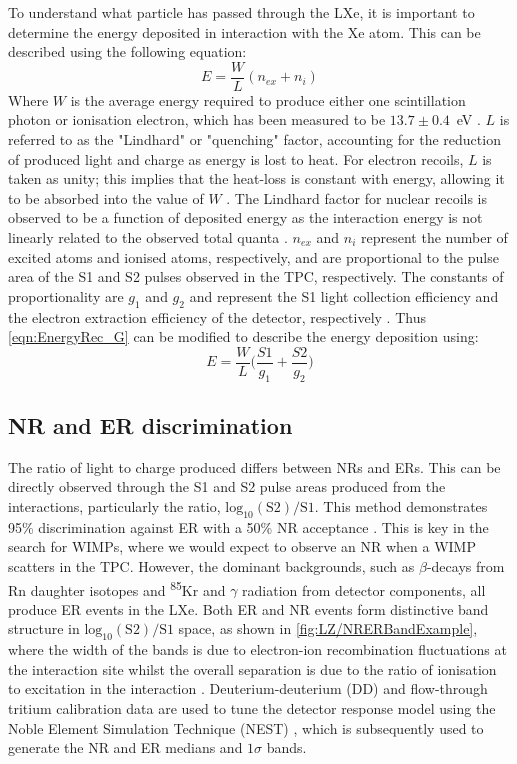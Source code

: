 To understand what particle has passed through the LXe, it is important to determine the energy deposited in interaction with the Xe atom. This can be described using the following equation:
\begin{equation}
    E=\frac{W}{L}(n_{ex}+n_{i})
    \label{eqn:EnergyRec_noG}
\end{equation}
Where $W$ is the average energy required to produce either one scintillation photon or ionisation electron, which has been measured to be $13.7\pm0.4$~eV \cite{Goetzke:2016lfg, Dahl:2009nta}.
$L$ is referred to as the "Lindhard" or "quenching" factor, accounting for the reduction of produced light and charge as energy is lost to heat. For electron recoils, $L$ is taken as unity; this implies that the heat-loss is constant with energy, allowing it to be absorbed into the value of $W$ \cite{Rischbieter:2022}. The Lindhard factor for nuclear recoils is observed to be a function of deposited energy as the interaction energy is not linearly related to the observed total quanta \cite{Sorensen:2011bd}.
$n_{ex}$ and $n_{i}$ represent the number of excited atoms and ionised atoms, respectively, and are proportional to the pulse area of the S1 and S2 pulses observed in the TPC, respectively. The constants of proportionality are $g_1$ and $g_2$ and represent the S1 light collection efficiency and the electron extraction efficiency of the detector, respectively \cite{NEST1}. Thus \autoref{eqn:EnergyRec_G} can be modified to describe the energy deposition using:
\begin{equation}
    E=\frac{W}{L}\bigg(\frac{S1}{g_1}+\frac{S2}{g_2}\biggl)
    \label{eqn:EnergyRec_G}
\end{equation}

\subsection{NR and ER discrimination}\label{sec:LZ/NRERDiscrim}
The ratio of light to charge produced differs between NRs and ERs. This can be directly observed through the S1 and S2 pulse areas produced from the interactions, particularly the ratio, $\text{log}_{10}(\text{S2})/\text{S1}$. This method demonstrates 95\% discrimination against ER with a 50\% NR acceptance \cite{lzSens}. This is key in the search for WIMPs, where we would expect to observe an NR when a WIMP scatters in the TPC. However, the dominant backgrounds, such as $\beta$-decays from Rn daughter isotopes and \textsuperscript{85}Kr and $\gamma$ radiation from detector components, all produce ER events in the LXe. Both ER and NR events form distinctive band structure in $\text{log}_{10}(\text{S2})/\text{S1}$ space, as shown in \autoref{fig:LZ/NRERBandExample}, where the width of the bands is due to electron-ion recombination fluctuations at the interaction site whilst the overall separation is due to the ratio of ionisation to excitation in the interaction \cite{Dahl:2009nta}. Deuterium-deuterium (DD) and flow-through tritium calibration data are used to tune the detector response model using the Noble Element Simulation Technique (NEST) \cite{NEST2011}, which is subsequently used to generate the NR and ER medians and $1\sigma$ bands.  

